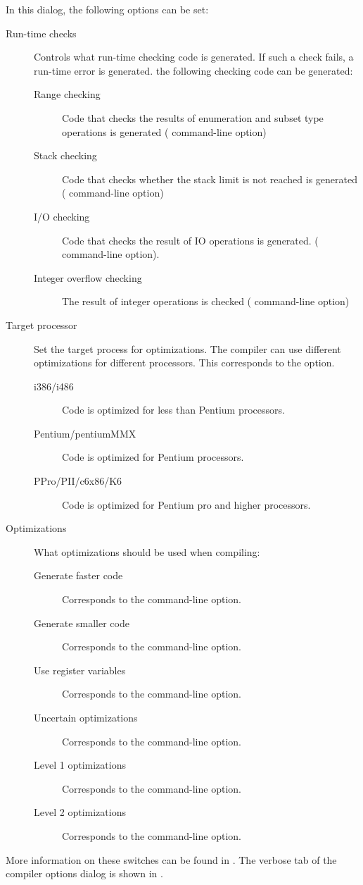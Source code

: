In this dialog, the following options can be set:
\begin{description}
\item[Run-time checks] Controls what run-time checking code is generated. If
such a check fails, a run-time error is generated.
the following checking code can be generated:
\begin{description}
\item[Range checking] Code that checks the results of enumeration and subset
type operations is generated ( command-line option)
\item[Stack checking] Code that checks whether the stack limit is not
reached is generated ( command-line option)
\item[I/O checking] Code that checks the result of IO operations is
generated. ( command-line option).
\item[Integer overflow checking] The result of integer operations is
checked ( command-line option)
\end{description}
\item[Target processor] Set the target process for optimizations. The
compiler can use different optimizations for different processors. This
corresponds to the  option.
\begin{description}
\item[i386/i486] Code is optimized for less than Pentium processors.
\item[Pentium/pentiumMMX] Code is optimized for Pentium processors.
\item[PPro/PII/c6x86/K6] Code is optimized for Pentium pro and higher
processors.
\end{description}
\item[Optimizations] What optimizations should be used when compiling:
\begin{description}
\item[Generate faster code] Corresponds to the  command-line option.
\item[Generate smaller code] Corresponds to the  command-line option.
\item[Use register variables] Corresponds to the  command-line
option.
\item[Uncertain optimizations] Corresponds to the  command-line
option.
\item[Level 1 optimizations] Corresponds to the  command-line
option.
\item[Level 2 optimizations] Corresponds to the  command-line
option.
\end{description}
\end{description}
More information on these switches can be found in .
The verbose tab of the compiler options dialog is shown in
.

